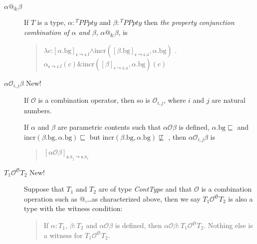 \begin{description}
    \item[\textnormal{$\alpha\text{@}_{\&}\beta$}] \mbox{}

  If $T$ is a type, $\alpha:{^T\textit{PPpty}}$ and
  $\beta:{^T\textit{PPpty}}$ 
  then \textit{the property conjunction
    combination of $\alpha$ and $\beta$}, $\alpha\text{@}_{\&}\beta$,
  is
\begin{quote}
  $\lambda
  c$:$[\alpha.\text{bg}]_{\mathfrak{c}\leadsto\mathfrak{c}.\text{f}}$\d{$\wedge$}$\mathrm{incr}([\beta.\text{bg}]_{\mathfrak{c}\leadsto\mathfrak{c}.\text{a}},\alpha.\text{bg})$
        . $\alpha_{\mathfrak{c}\leadsto\mathfrak{c}.\text{f}}(c)\&\mathrm{incr}([\beta]_{\mathfrak{c}\leadsto\mathfrak{c}.\text{a}},\alpha.\text{bg})(c)$
      \end{quote}

     
    \item[\textnormal{$\alpha\mathcal{O}_{i,j}\beta$} New!] \mbox{}

      If $\mathcal{O}$ is a combination operator, then so is
$\mathcal{O}_{i,j}$, where $i$ and $j$ are natural numbers.

If
$\alpha$ and $\beta$ are parametric contents such that
$\alpha\mathcal{O}\beta$ is defined, $\alpha.\text{bg}\sqsubseteq$
and $\mathrm{incr}(\beta.\text{bg},\alpha.\text{bg})\sqsubseteq$
but $\mathrm{incr}(\beta.\text{bg},\alpha.\text{bg})\not\sqsubseteq$
,
then $\alpha\mathcal{O}_{i,j}\beta$ is
\begin{quote}
  $[\alpha\mathcal{O}\beta]_{\mathfrak{s}.\text{x}_j\leadsto\mathfrak{s}.\text{x}_i}$
\end{quote}


      
    \item[\textnormal{$T_1\mathcal{O}^{\mathfrak{S}}T_2$} New!]
      \mbox{}

      Suppose that $T_1$ and
$T_2$ are of type \textit{ContType} and that $\mathcal{O}$ is a combination
operation such as @,\ldots as characterized above, then we say $T_1\mathcal{O}^{\mathfrak{S}}T_2$
is also a type with the witness condition:
\begin{quote} 
If $\alpha:T_1$, $\beta:T_2$ and $\alpha\mathcal{O}\beta$ is defined,
then $\alpha\mathcal{O}\beta:T_1\mathcal{O}^{\mathfrak{S}}T_2$.
Nothing else is a witness for $T_1\mathcal{O}^{\mathfrak{S}}T_2$. 
\end{quote} 



\end{description}
